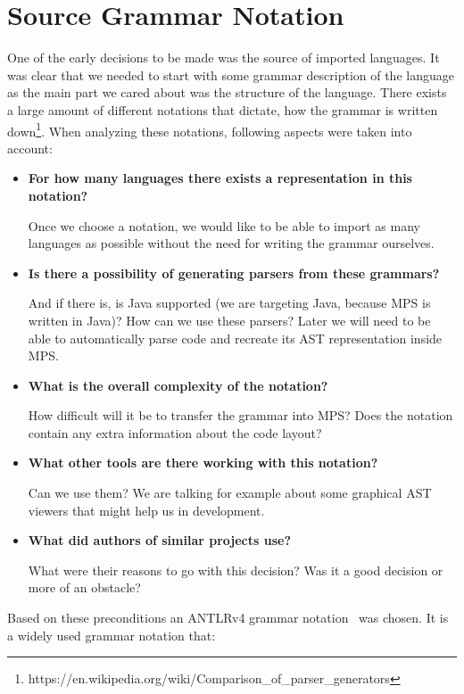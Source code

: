 \chapter{Source Grammar Notation}
\label{chap:source_grammar_notation}

One of the early decisions to be made was the source of imported languages.
It was clear that we needed to start with some grammar description of the language as the main part we cared about was the structure of the language.
There exists a large amount of different notations that dictate, how the grammar is written down\footnote{https://en.wikipedia.org/wiki/Comparison{\_}of{\_}parser{\_}generators}.
When analyzing these notations, following aspects were taken into account:

\begin{itemize}
	\item \textbf{For how many languages there exists a representation in this notation?}

	Once we choose a notation, we would like to be able to import as many languages as possible without the need for writing the grammar ourselves.

	\item \textbf{Is there a possibility of generating parsers from these grammars?}

	And if there is, is Java supported (we are targeting Java, because MPS is written in Java)? How can we use these parsers? Later we will need to be able to automatically parse code and recreate its AST representation inside MPS.

	\item \textbf{What is the overall complexity of the notation?}

	How difficult will it be to transfer the grammar into MPS? Does the notation contain any extra information about the code layout?

	\item \textbf{What other tools are there working with this notation?}

	Can we use them? We are talking for example about some graphical AST viewers that might help us in development.

	\item \textbf{What did authors of similar projects use?}

	What were their reasons to go with this decision? Was it a good decision or more of an obstacle?
\end{itemize}

Based on these preconditions an ANTLRv4 grammar notation~\cite{ANTLR4reference} was chosen.
It is a widely used grammar notation that:

